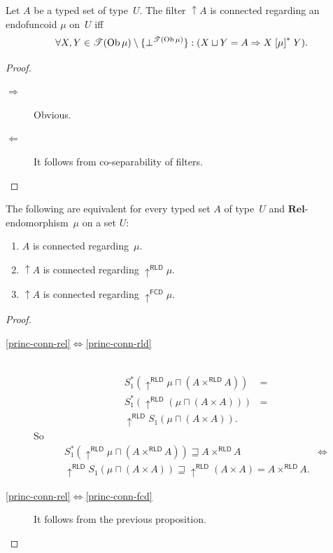 \begin{prop}
Let $A$ be a typed set of type~$U$. The filter $\uparrow A$ is
connected regarding an endofuncoid $\mu$ on~$U$ iff
\[
\forall X,Y\in\mathscr{T}(\operatorname{Ob}\mu)\setminus\{\bot^{\mathscr{T}(\operatorname{Ob}\mu)}\}:(X\sqcup Y=A\Rightarrow X\mathrel{\left[\mu\right]^{\ast}}Y).
\]
\end{prop}
\begin{proof}
~
\begin{description}
\item [{$\Rightarrow$}] Obvious.
\item [{$\Leftarrow$}] It follows from co-separability of filters.
\end{description}
\end{proof}
\begin{thm}
The following are equivalent for every typed set $A$ of type~$U$
and $\mathbf{Rel}$-endomorphism~$\mu$ on a set $U$:
\begin{enumerate}
\item \label{princ-conn-rel}$A$ is connected regarding~$\mu$.
\item \label{princ-conn-rld}$\uparrow A$ is connected regarding $\uparrow^{\mathsf{RLD}}\mu$.
\item \label{princ-conn-fcd}$\uparrow A$ is connected regarding $\uparrow^{\mathsf{FCD}}\mu$.
\end{enumerate}
\end{thm}
\begin{proof}
~
\begin{description}
\item [{\ref{princ-conn-rel}$\Leftrightarrow$\ref{princ-conn-rld}}] ~
\begin{align*}
S^{\ast}_1(\uparrow^{\mathsf{RLD}}\mu\sqcap(A\times^{\mathsf{RLD}}A)) & =\\
S^{\ast}_1(\uparrow^{\mathsf{RLD}}(\mu\sqcap(A\times A))) & =\\
\uparrow^{\mathsf{RLD}}S_1(\mu\sqcap(A\times A)).
\end{align*}
So
\begin{align*}
S^{\ast}_1(\uparrow^{\mathsf{RLD}}\mu\sqcap(A\times^{\mathsf{RLD}}A))\sqsupseteq A\times^{\mathsf{RLD}}A & \Leftrightarrow\\
\uparrow^{\mathsf{RLD}}S_1(\mu\sqcap(A\times A))\sqsupseteq\uparrow^{\mathsf{RLD}}(A\times A)=A\times^{\mathsf{RLD}}A.
\end{align*}

\item [{\ref{princ-conn-rel}$\Leftrightarrow$\ref{princ-conn-fcd}}] It
follows from the previous proposition.
\end{description}
\end{proof}
